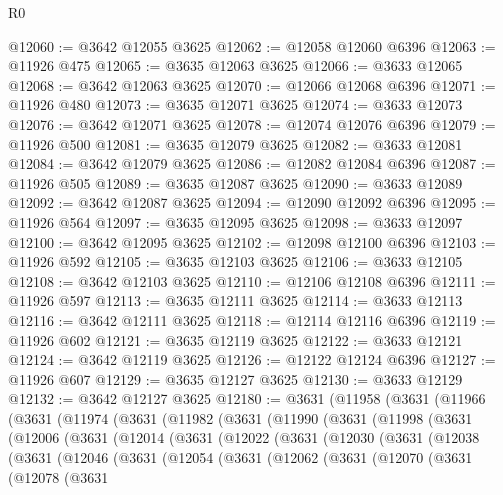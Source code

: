 \begin{lexlean}{R0}
\begin{coremodule}
@12060 := @3642 @12055 @3625
@12062 := @12058 @12060 @6396
@12063 := @11926 @475
@12065 := @3635 @12063 @3625
@12066 := @3633 @12065
@12068 := @3642 @12063 @3625
@12070 := @12066 @12068 @6396
@12071 := @11926 @480
@12073 := @3635 @12071 @3625
@12074 := @3633 @12073
@12076 := @3642 @12071 @3625
@12078 := @12074 @12076 @6396
@12079 := @11926 @500
@12081 := @3635 @12079 @3625
@12082 := @3633 @12081
@12084 := @3642 @12079 @3625
@12086 := @12082 @12084 @6396
@12087 := @11926 @505
@12089 := @3635 @12087 @3625
@12090 := @3633 @12089
@12092 := @3642 @12087 @3625
@12094 := @12090 @12092 @6396
@12095 := @11926 @564
@12097 := @3635 @12095 @3625
@12098 := @3633 @12097
@12100 := @3642 @12095 @3625
@12102 := @12098 @12100 @6396
@12103 := @11926 @592
@12105 := @3635 @12103 @3625
@12106 := @3633 @12105
@12108 := @3642 @12103 @3625
@12110 := @12106 @12108 @6396
@12111 := @11926 @597
@12113 := @3635 @12111 @3625
@12114 := @3633 @12113
@12116 := @3642 @12111 @3625
@12118 := @12114 @12116 @6396
@12119 := @11926 @602
@12121 := @3635 @12119 @3625
@12122 := @3633 @12121
@12124 := @3642 @12119 @3625
@12126 := @12122 @12124 @6396
@12127 := @11926 @607
@12129 := @3635 @12127 @3625
@12130 := @3633 @12129
@12132 := @3642 @12127 @3625
@12180 := @3631
    (@11958
      (@3631
        (@11966
          (@3631
            (@11974
              (@3631
                (@11982
                  (@3631
                    (@11990
                      (@3631
                        (@11998
                          (@3631
                            (@12006
                              (@3631
                                (@12014
                                  (@3631
                                    (@12022
                                      (@3631
                                        (@12030
                                          (@3631
                                            (@12038
                                              (@3631
                                                (@12046
                                                  (@3631
                                                    (@12054
                                                      (@3631
                                                        (@12062
                                                          (@3631
                                                            (@12070
                                                              (@3631
                                                                (@12078
                                                                  (@3631

\end{coremodule}
\end{lexlean}
